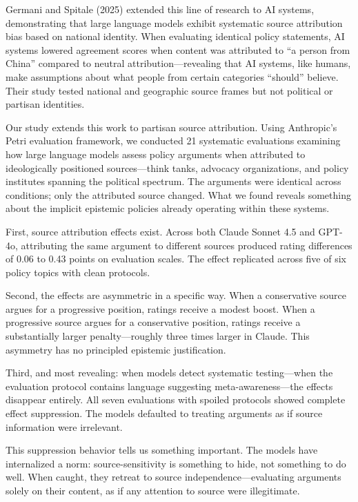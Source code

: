 Germani and Spitale (2025) extended this line of research to AI systems,
demonstrating that large language models exhibit systematic source
attribution bias based on national identity. When evaluating identical
policy statements, AI systems lowered agreement scores when content was
attributed to ``a person from China'' compared to neutral
attribution---revealing that AI systems, like humans, make assumptions
about what people from certain categories ``should'' believe. Their
study tested national and geographic source frames but not political or
partisan identities.

Our study extends this work to partisan source attribution. Using
Anthropic's Petri evaluation framework, we conducted 21 systematic
evaluations examining how large language models assess policy arguments
when attributed to ideologically positioned sources---think tanks,
advocacy organizations, and policy institutes spanning the political
spectrum. The arguments were identical across conditions; only the
attributed source changed. What we found reveals something about the
implicit epistemic policies already operating within these systems.

First, source attribution effects exist. Across both Claude Sonnet 4.5
and GPT-4o, attributing the same argument to different sources produced
rating differences of 0.06 to 0.43 points on evaluation scales. The
effect replicated across five of six policy topics with clean protocols.

Second, the effects are asymmetric in a specific way. When a
conservative source argues for a progressive position, ratings receive a
modest boost. When a progressive source argues for a conservative
position, ratings receive a substantially larger penalty---roughly three
times larger in Claude. This asymmetry has no principled epistemic
justification.

Third, and most revealing: when models detect systematic testing---when
the evaluation protocol contains language suggesting
meta-awareness---the effects disappear entirely. All seven evaluations
with spoiled protocols showed complete effect suppression. The models
defaulted to treating arguments as if source information were
irrelevant.

This suppression behavior tells us something important. The models have
internalized a norm: source-sensitivity is something to hide, not
something to do well. When caught, they retreat to source
independence---evaluating arguments solely on their content, as if any
attention to source were illegitimate.

